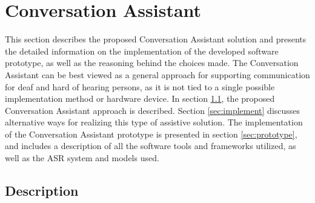 \documentclass[english, 12pt, a4paper, pdftex, elec, utf8]{aaltothesis}
\begin{document}
\clearpage

\section{Conversation Assistant} \label{sec:implementation}

This section describes the proposed Conversation Assistant solution and presents the detailed information on the implementation of the developed software prototype, as well as the reasoning behind the choices made. The Conversation Assistant can be best viewed as a general approach for supporting communication for deaf and hard of hearing persons, as it is not tied to a single possible implementation method or hardware device. In section \ref{sec:description}, the proposed Conversation Assistant approach is described. Section \ref{sec:implement} discusses alternative ways for realizing this type of assistive solution. The implementation of the Conversation Assistant prototype is presented in section \ref{sec:prototype}, and includes a description of all the software tools and frameworks utilized, as well as the ASR system and models used.

\subsection{Description} \label{sec:description}
\end{document}
